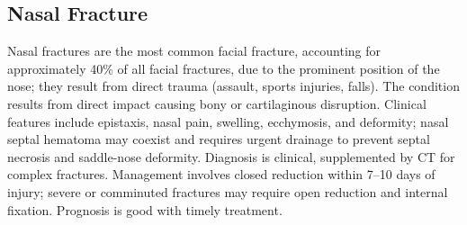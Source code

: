 \subsection{Nasal Fracture}
\label{sec:Nasal Fracture}
Nasal fractures are the most common facial fracture, accounting for approximately 40\% of all facial fractures, due to the prominent position of the nose; they result from direct trauma (assault, sports injuries, falls). The condition results from direct impact causing bony or cartilaginous disruption. Clinical features include epistaxis, nasal pain, swelling, ecchymosis, and deformity; nasal septal hematoma may coexist and requires urgent drainage to prevent septal necrosis and saddle-nose deformity. Diagnosis is clinical, supplemented by CT for complex fractures. Management involves closed reduction within 7--10 days of injury; severe or comminuted fractures may require open reduction and internal fixation. Prognosis is good with timely treatment.

